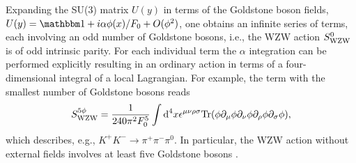 \documentclass[twoside,12pt]{article}
\begin{document}
   Expanding the SU(3) matrix $U(y)$ in terms of the Goldstone
boson fields, $U(y)={\mathbbm 1}+i\alpha \phi(x)/F_0+O(\phi^2)$, one obtains
an infinite series of terms, each involving an odd number of
Goldstone bosons, i.e., the WZW action $S_{\rm WZW}^0$
is of odd intrinsic parity.
   For each individual term the $\alpha$ integration can be performed
explicitly resulting in an ordinary action in terms of a four-dimensional
integral of a local Lagrangian.
   For example, the term with the smallest number of Goldstone bosons
reads
\begin{equation}
\label{3:2:2:swzw5phi}
S_{\rm WZW}^{5\phi}
=\frac{1}{240\pi^2 F^5_0}\int \mbox{d}^4 x
\epsilon^{\mu\nu\rho\sigma}\mbox{Tr}(\phi\partial_\mu\phi\partial_\nu\phi
\partial_\rho\phi\partial_\sigma\phi),
\end{equation}
which describes, e.g., $K^+K^-\to\pi^+\pi^-\pi^0$.
   In particular, the WZW action without external fields involves at
least five Goldstone bosons \cite{Wess:1971yu}.
\end{document}
